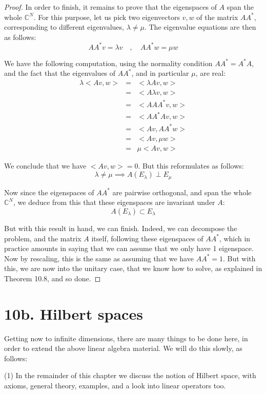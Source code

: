 \documentclass[12pt]{amsbook}
\begin{document}
\begin{proof}
In order to finish, it remains to prove that the eigenspaces of $A$ span the whole $\mathbb C^N$. For this purpose, let us pick two eigenvectors $v,w$ of the matrix $AA^*$, corresponding to different eigenvalues, $\lambda\neq\mu$. The eigenvalue equations are then as follows:
$$AA^*v=\lambda v\quad,\quad 
AA^*w=\mu w$$

We have the following computation, using the normality condition $AA^*=A^*A$, and the fact that the eigenvalues of $AA^*$, and in particular $\mu$, are real:
\begin{eqnarray*}
\lambda<Av,w>
&=&<\lambda Av,w>\\
&=&<A\lambda v,w>\\
&=&<AAA^*v,w>\\
&=&<AA^*Av,w>\\
&=&<Av,AA^*w>\\
&=&<Av,\mu w>\\
&=&\mu<Av,w>
\end{eqnarray*}

We conclude that we have $<Av,w>=0$. But this reformulates as follows:
$$\lambda\neq\mu\implies A(E_\lambda)\perp E_\mu$$

Now since the eigenspaces of $AA^*$ are pairwise orthogonal, and span the whole $\mathbb C^N$, we deduce from this that these eigenspaces are invariant under $A$:
$$A(E_\lambda)\subset E_\lambda$$

But with this result in hand, we can finish. Indeed, we can decompose the problem, and the matrix $A$ itself, following these eigenspaces of $AA^*$, which in practice amounts in saying that we can assume that we only have 1 eigenspace. Now by rescaling, this is the same as assuming that we have $AA^*=1$. But with this, we are now into the unitary case, that we know how to solve, as explained in Theorem 10.8, and so done.
\end{proof}

\section*{10b. Hilbert spaces}

Getting now to infinite dimensions, there are many things to be done here, in order to extend the above linear algebra material. We will do this slowly, as follows:

\bigskip

(1) In the remainder of this chapter we discuss the notion of Hilbert space, with axioms, general theory, examples, and a look into linear operators too.
\end{document}
